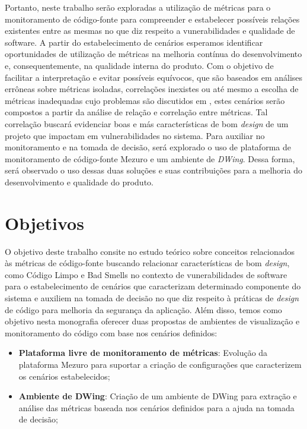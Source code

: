 Portanto, neste trabalho serão exploradas a utilização de métricas para o monitoramento de código-fonte para compreender e estabelecer possíveis relações existentes entre as mesmas no que diz respeito a vunerabilidades e qualidade de software.
%
A partir do estabelecimento de cenários esperamos identificar oportunidades de utilização de métricas na melhoria contínua do desenvolvimento e, consequentemente, na qualidade interna do produto. Com o objetivo de facilitar a interpretação e evitar possíveis equívocos, que são baseados em análises errôneas sobre métricas isoladas, correlações inexistes ou até mesmo a escolha de métricas inadequadas cujo problemas são discutidos em \cite{chidamber1994}, estes cenários serão compostos a partir da análise de relação e correlação entre métricas. Tal correlação buscará evidenciar boas e más características de bom \emph{design} de um projeto que impactam em vulnerabilidades no sistema.
%
Para auxiliar no monitoramento e na tomada de decisão, será explorado o uso de plataforma de monitoramento de código-fonte Mezuro e um ambiente de \emph{DWing}.
%
Dessa forma, será observado o uso dessas duas soluções e suas contribuições para a melhoria do desenvolvimento e qualidade do produto.


\section{Objetivos}

O objetivo deste trabalho consite no estudo teórico sobre conceitos relacionados às métricas de código-fonte buscando relacionar características de bom \emph{design}, como Código Limpo e Bad Smells no contexto de vunerabilidades de software  para o estabelecimento de cenários que caracterizam determinado componente do sistema e auxiliem na tomada de decisão no que diz respeito à práticas de \emph{design} de código para melhoria da segurança da aplicação.
%
Além disso, temos como objetivo nesta monografia oferecer duas propostas de ambientes de visualização e monitoramento do código com base nos cenários definidos:
\begin{itemize}
\item \textbf{Plataforma livre de monitoramento de métricas}: Evolução da plataforma Mezuro para suportar a criação de configurações que caracterizem os cenários estabelecidos;
\item \textbf{Ambiente de DWing}: Criação de um ambiente de DWing para extração e análise das métricas baseada nos cenários definidos para a ajuda na tomada de decisão;
\end{itemize}

